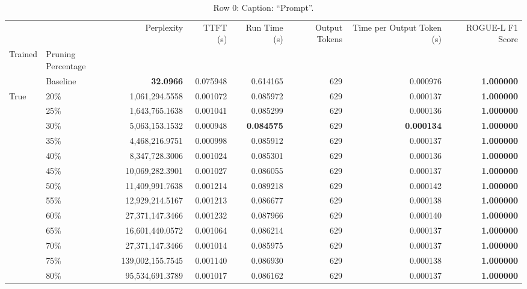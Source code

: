 \begin{table}[H]
\centering
\caption{Row 0: Caption: ``Prompt''.}
\label{tab:evaluation-pipeline-0}
\begin{tabular}{llrrrrrr}
\toprule
 &  & Perplexity & TTFT (s) & Run Time (s) & Output Tokens & Time per Output Token (s) & ROGUE-L F1 Score \\
Trained & Pruning Percentage &  &  &  &  &  &  \\
\midrule
 & Baseline & \bfseries 32.0966 & 0.075948 & 0.614165 & 629 & 0.000976 & \bfseries 1.000000 \\
\multirow[c]{16}{*}{True} & 20\% & 1,061,294.5558 & 0.001072 & 0.085972 & \color{red} 629 & 0.000137 & \bfseries \color{red} 1.000000 \\
 & 25\% & 1,643,765.1638 & 0.001041 & 0.085299 & \color{red} 629 & 0.000136 & \bfseries \color{red} 1.000000 \\
 & 30\% & 5,063,153.1532 & 0.000948 & \bfseries \color{red} 0.084575 & \color{red} 629 & \bfseries \color{red} 0.000134 & \bfseries \color{red} 1.000000 \\
 & 35\% & 4,468,216.9751 & 0.000998 & 0.085912 & \color{red} 629 & 0.000137 & \bfseries \color{red} 1.000000 \\
 & 40\% & 8,347,728.3006 & 0.001024 & 0.085301 & \color{red} 629 & 0.000136 & \bfseries \color{red} 1.000000 \\
 & 45\% & 10,069,282.3901 & 0.001027 & 0.086055 & \color{red} 629 & 0.000137 & \bfseries \color{red} 1.000000 \\
 & 50\% & 11,409,991.7638 & 0.001214 & 0.089218 & \color{red} 629 & 0.000142 & \bfseries \color{red} 1.000000 \\
 & 55\% & 12,929,214.5167 & 0.001213 & 0.086677 & \color{red} 629 & 0.000138 & \bfseries \color{red} 1.000000 \\
 & 60\% & 27,371,147.3466 & 0.001232 & 0.087966 & \color{red} 629 & 0.000140 & \bfseries \color{red} 1.000000 \\
 & 65\% & 16,601,440.0572 & 0.001064 & 0.086214 & \color{red} 629 & 0.000137 & \bfseries \color{red} 1.000000 \\
 & 70\% & 27,371,147.3466 & 0.001014 & 0.085975 & \color{red} 629 & 0.000137 & \bfseries \color{red} 1.000000 \\
 & 75\% & 139,002,155.7545 & 0.001140 & 0.086930 & \color{red} 629 & 0.000138 & \bfseries \color{red} 1.000000 \\
 & 80\% & 95,534,691.3789 & 0.001017 & 0.086162 & \color{red} 629 & 0.000137 & \bfseries \color{red} 1.000000 \\

\end{tabular}
\end{table}
